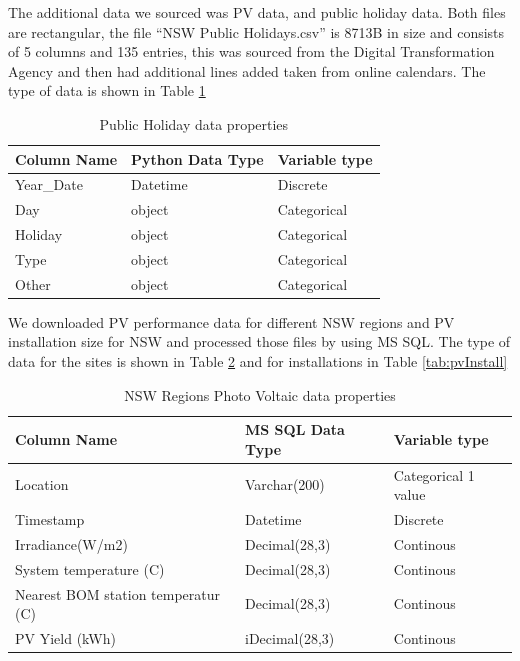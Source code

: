 \documentclass[mstat,12pt]{unswthesis}
\begin{document}
The additional data we sourced was PV data, and public holiday data.
Both files are rectangular, the file ``NSW Public Holidays.csv'' is
8713B in size and consists of 5 columns and 135 entries, this was
sourced from the Digital Transformation Agency \cite{_australian} and
then had additional lines added taken from online calendars. The type of
data is shown in Table \ref{tab:public}

\begin{table}[H]
\centering
\begin{tabular}{lll} 
\hline\hline
\textbf{Column Name} & \textbf{Python Data Type} & \textbf{Variable type}  \\ 
\hline\hline
Year\_Date  & Datetime         & Discrete    \\
Day         & object           & Categorical    \\
Holiday     & object           & Categorical    \\
Type        & object           & Categorical    \\
Other       & object           & Categorical    \\
\hline\hline
\end{tabular}
\caption{Public Holiday data properties}
\label{tab:public}
\end{table}

We downloaded PV performance data for different NSW regions and PV
installation size for NSW and processed those files by using MS
SQL\cite{_2021_australian}. The type of data for the sites is shown in
Table \ref{tab:pvSite} and for installations in Table
\ref{tab:pvInstall}

\begin{table}[H]
\centering
\begin{tabular}{lll} 
\hline\hline
\textbf{Column Name} & \textbf{MS SQL Data Type} & \textbf{Variable type}  \\ 
\hline\hline
Location                            & Varchar(200)        & Categorical 1 value    \\
Timestamp                           & Datetime            & Discrete      \\
Irradiance(W/m2)                    & Decimal(28,3)       & Continous    \\
System temperature (C)              & Decimal(28,3)       & Continous      \\
Nearest BOM station temperatur (C)  & Decimal(28,3)       & Continous    \\
PV Yield (kWh)                      & iDecimal(28,3)      & Continous      \\
\hline\hline
\end{tabular}
\caption{NSW Regions Photo Voltaic data properties}
\label{tab:pvSite}
\end{table}
\end{document}
